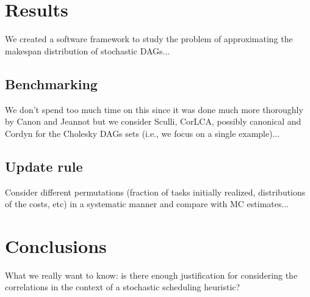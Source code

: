 \documentclass[12pt]{article}
\begin{document}
\section{Results}
\label{sect.results}

We created a software framework to study the problem of approximating the makespan distribution of stochastic DAGs...

\subsection{Benchmarking}
\label{subsect.benchmarking}

We don't spend too much time on this since it was done much more thoroughly by Canon and Jeannot but we consider Sculli, CorLCA, possibly canonical and Cordyn for the Cholesky DAGs sets (i.e., we focus on a single example)...

\subsection{Update rule}
\label{subsect.results_update_rule}

Consider different permutations (fraction of tasks initially realized, distributions of the costs, etc) in a systematic manner and compare with MC estimates... 

\section{Conclusions}
\label{sect.conclusions}

What we really want to know: is there enough justification for considering the correlations in the context of a stochastic scheduling heuristic? 



\end{document}
